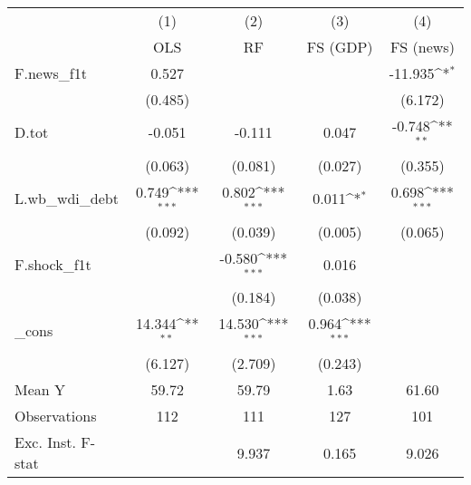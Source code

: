 {
\def\sym#1{\ifmmode^{#1}\else\(^{#1}\)\fi}
\begin{tabular}{l*{4}{c}}
\toprule
            &\multicolumn{1}{c}{(1)}&\multicolumn{1}{c}{(2)}&\multicolumn{1}{c}{(3)}&\multicolumn{1}{c}{(4)}\\
            &\multicolumn{1}{c}{OLS}&\multicolumn{1}{c}{RF}&\multicolumn{1}{c}{FS (GDP)}&\multicolumn{1}{c}{FS (news)}\\
\midrule
F.news\_f1t  &       0.527         &                     &                     &     -11.935\sym{*}  \\
            &     (0.485)         &                     &                     &     (6.172)         \\
\addlinespace
D.tot       &      -0.051         &      -0.111         &       0.047         &      -0.748\sym{**} \\
            &     (0.063)         &     (0.081)         &     (0.027)         &     (0.355)         \\
\addlinespace
L.wb\_wdi\_debt&       0.749\sym{***}&       0.802\sym{***}&       0.011\sym{*}  &       0.698\sym{***}\\
            &     (0.092)         &     (0.039)         &     (0.005)         &     (0.065)         \\
\addlinespace
F.shock\_f1t &                     &      -0.580\sym{***}&       0.016         &                     \\
            &                     &     (0.184)         &     (0.038)         &                     \\
\addlinespace
\_cons      &      14.344\sym{**} &      14.530\sym{***}&       0.964\sym{***}&                     \\
            &     (6.127)         &     (2.709)         &     (0.243)         &                     \\
\midrule
Mean Y      &       59.72         &       59.79         &        1.63         &       61.60         \\
Observations&         112         &         111         &         127         &         101         \\
Exc. Inst. F-stat&                     &       9.937         &       0.165         &       9.026         \\
\bottomrule
\end{tabular}
}
